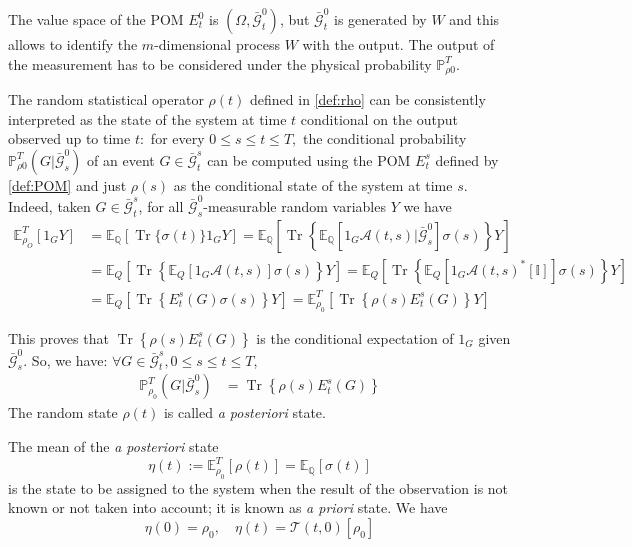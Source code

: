 The value space of the POM $E_{t}^{0}$ is $\left(\Omega, \bar{\mathcal{G}}_{t}^{0}\right)$, but $\bar{\mathcal{G}}_{t}^{0}$ is generated by $W$ and this allows to identify the $m$-dimensional process $W$ with the output. The output of the measurement has to be considered under the physical probability $ \mathbb{P}_{\rho 0}^{T} $.

The random statistical operator $\rho(t)$ defined in \eqref{def:rho} can be consistently interpreted as the state of the system at time $t$ conditional on the output observed up to time $t:$ for every $0 \leq s \leq t \leq T,$ the conditional probability $\mathbb{P}_{\rho 0}^{T}\left(G | \bar{\mathcal{G}}_{s}^{0}\right)$ of an event $G \in \bar{\mathcal{G}}_{t}^{s}$  can be computed using the POM $E_{t}^{s}$ defined by \eqref{def:POM} and just $\rho(s)$ as the conditional state of the system at time $s$. Indeed, taken $G \in \bar{\mathcal{G}}_{t}^{s}$, for all $\bar{\mathcal{G}}_{s}^{0}$-measurable random variables $Y$ we have
\[
\begin{aligned}
\mathbb{E}_{\rho_{O}}^{T}\left[1_{G} Y\right]&=\mathbb{E}_\mathbb{Q}\left[\operatorname{Tr}\{\sigma(t)\} 1_{G} Y\right]=\mathbb{E}_{\mathbb{Q}}\left[\operatorname{Tr}\left\{\mathbb{E}_\mathbb{Q}\left[\left.1_{G} \mathcal{A}(t, s)\right|\bar{\mathcal{G}}_{s}^{0}\right] \sigma(s)\right\} Y\right]\\
&=\mathbb{E}_{Q}\left[\operatorname{Tr}\left\{\mathbb{E}_{Q}\left[1_{G} \mathcal{A}(t, s)\right] \sigma(s)\right\} Y\right]=\mathbb{E}_{Q}\left[\operatorname{Tr}\left\{\mathbb{E}_{Q}\left[1_{G} \mathcal{A}(t, s)^{*}[\mathbb{I}]\right] \sigma(s)\right\} Y\right]\\
&=\mathbb{E}_{Q}\left[\operatorname{Tr}\left\{E_{t}^{s}(G) \sigma(s)\right\} Y\right]=\mathbb{E}_{\rho_{0}}^{T}\left[\operatorname{Tr}\left\{\rho(s) E_{t}^{s}(G)\right\} Y\right]
\end{aligned}
 \]

This proves that $\operatorname{Tr}\left\{\rho(s) E_{t}^{s}(G)\right\}$ is the conditional expectation of $1_{G}$ given $\bar{\mathcal{G}}_{s}^{0} .$ So, we have: $\forall G \in \bar{\mathcal{G}}_{t}^{s}, 0 \leq s \leq t \leq T$,
\[ \begin{aligned} \mathbb{P}_{\rho_{0}}^{T}\left(G | \bar{\mathcal{G}}_{s}^{0}\right) &=\operatorname{Tr}\left\{\rho(s) E_{t}^{s}(G)\right\} \end{aligned} \]
The random state $\rho(t)$ is called \textit{a posteriori} state.

The mean of the \textit{a posteriori} state
\[ \eta(t):=\mathbb{E}_{\rho_{0}}^{T}[\rho(t)]=\mathbb{E}_{\mathbb{Q}}[\sigma(t)] \] is the state to be assigned to the system when the result of the observation is not known or not taken into account; it is known as \textit{a priori} state. We have \[ \eta(0)=\rho_{0}, \quad \eta(t)=\mathcal{T}(t, 0)\left[\rho_{0}\right] \]

